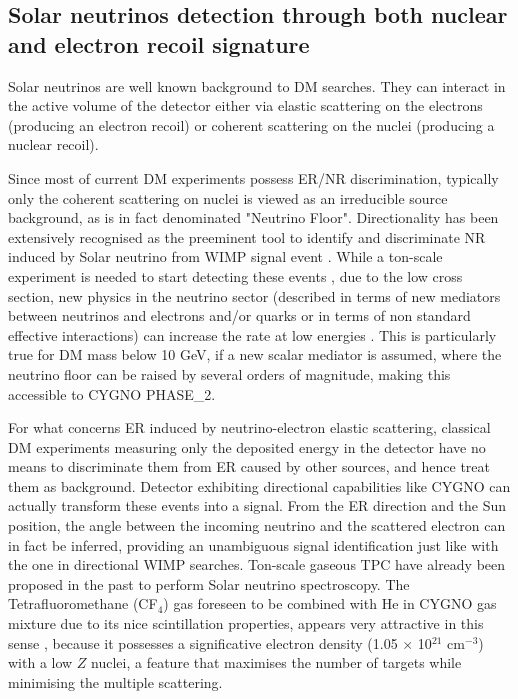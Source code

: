 \documentclass[physics,article,submit,moreauthors,pdftex]{Definitions/mdpi}
\begin{document}
\subsection{Solar neutrinos detection through both nuclear and electron recoil signature}
Solar neutrinos are well known background to DM searches. They can interact in the active volume of the detector either via elastic scattering on the electrons (producing an electron recoil) or coherent scattering on the nuclei (producing a nuclear recoil). 

Since most of current DM experiments possess ER/NR discrimination, typically only the coherent scattering on nuclei is viewed as an irreducible source background, as is in fact denominated "Neutrino Floor". Directionality has been extensively recognised as the preeminent tool to identify and discriminate NR induced by Solar neutrino from WIMP signal event \cite{Mayet:2016zxu,Vahsen:2020pzb, Billard:2013qya}. While a ton-scale experiment is needed to start detecting these events \cite{Vahsen:2020pzb}, due to the low cross section, new physics in the neutrino sector (described in terms of new mediators between neutrinos and electrons and/or quarks or in terms of non standard effective interactions) can increase the rate at low energies \cite{Boehm:2018sux, bib:bertuzzo}. This is particularly true for DM mass below 10 GeV, if a new scalar mediator is assumed, where the neutrino floor can be raised by several orders of magnitude, making this accessible to CYGNO PHASE\_2. 

For what concerns ER induced by neutrino-electron elastic scattering, classical DM experiments measuring only the deposited energy in the detector have no means to discriminate them from ER caused by other sources, and hence treat them as background. Detector exhibiting directional capabilities like CYGNO can actually transform these events into a signal. From the ER direction and the Sun position, the angle between the incoming neutrino and the scattered electron can in fact be inferred, providing an unambiguous signal identification just like with the one in directional WIMP searches. Ton-scale gaseous TPC have already been proposed in the past \cite{Seguinot:1992zu,Arpesella:1996uc} to perform Solar neutrino spectroscopy. The Tetrafluoromethane (CF$_4$) gas foreseen to be combined with He in CYGNO gas mixture due to its nice scintillation properties, appears very attractive in this sense \cite{Arpesella:1996uc}, because it possesses a significative electron density (1.05 $\times$ 10$^{21}$ cm$^{-3}$) with a low $Z$ nuclei, a feature that maximises the number of targets while minimising the multiple scattering. 
\end{document}
